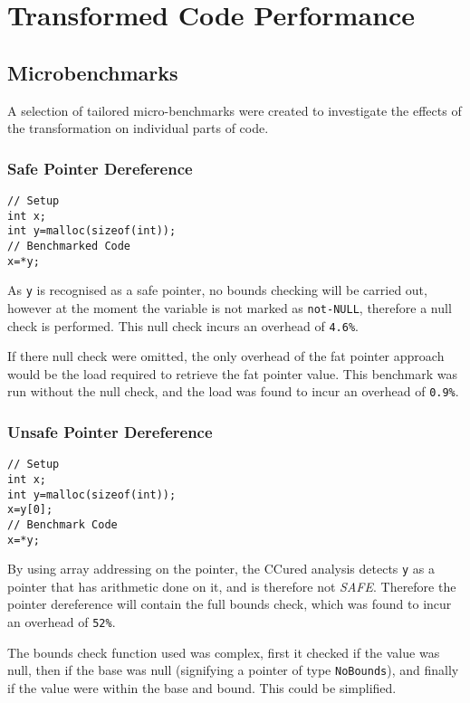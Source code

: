 \section{Transformed Code Performance}
\subsection{Microbenchmarks}

A selection of tailored micro-benchmarks were created to investigate the effects of the transformation on individual parts of code.

\subsubsection{Safe Pointer Dereference}

\begin{verbatim}
// Setup
int x;
int y=malloc(sizeof(int));
// Benchmarked Code
x=*y;
\end{verbatim}

As \verb!y! is recognised as a safe pointer, no bounds checking will be carried out, however at the moment the variable is not marked as \verb!not-NULL!, therefore a null check is performed.
This null check incurs an overhead of \verb!4.6%!.

If there null check were omitted, the only overhead of the fat pointer approach would be the load required to retrieve the fat pointer value.
This benchmark was run without the null check, and the load was found to incur an overhead of \verb!0.9%!.

\subsubsection{Unsafe Pointer Dereference}

\begin{verbatim}
// Setup
int x;
int y=malloc(sizeof(int));
x=y[0];
// Benchmark Code
x=*y;
\end{verbatim}

By using array addressing on the pointer, the CCured analysis detects \verb!y! as a pointer that has arithmetic done on it, and is therefore not \textit{SAFE}.
Therefore the pointer dereference will contain the full bounds check, which was found to incur an overhead of \verb!52%!.

The bounds check function used was complex, first it checked if the value was null, then if the base was null (signifying a pointer of type \verb!NoBounds!), and finally if the value were within the base and bound.
This could be simplified.

